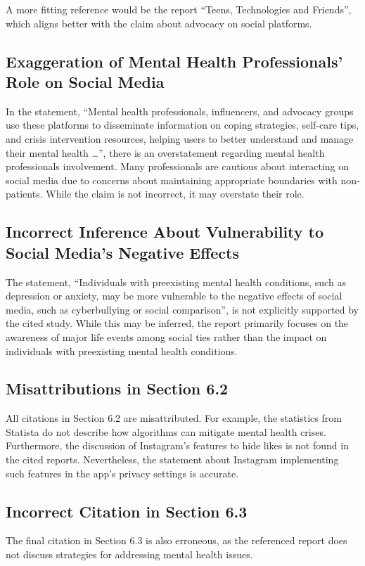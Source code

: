 \documentclass[12pt]{article}
\begin{document}
A more fitting reference would be the report ``Teens, Technologies and Friends'', which aligns better with the claim about advocacy on social platforms.

\subsection{Exaggeration of Mental Health Professionals' Role on Social Media}
In the statement, ``Mental health professionals, influencers, and advocacy groups use these platforms to disseminate information on coping strategies, self-care tips, and crisis intervention resources, helping users to better understand and manage their mental health \dots'', there is an overstatement regarding mental health professionals involvement. Many professionals are cautious about interacting on social media due to concerns about maintaining appropriate boundaries with non-patients. While the claim is not incorrect, it may overstate their role.

\subsection{Incorrect Inference About Vulnerability to Social Media's Negative Effects}
The statement, ``Individuals with preexisting mental health conditions, such as depression or anxiety, may be more vulnerable to the negative effects of social media, such as cyberbullying or social comparison'', is not explicitly supported by the cited study. While this may be inferred, the report primarily focuses on the awareness of major life events among social ties rather than the impact on individuals with preexisting mental health conditions.

\subsection{Misattributions in Section 6.2}
All citations in Section 6.2 are misattributed. For example, the statistics from Statista do not describe how algorithms can mitigate mental health crises. Furthermore, the discussion of Instagram's features to hide likes is not found in the cited reports. Nevertheless, the statement about Instagram implementing such features in the app's privacy settings is accurate.

\subsection{Incorrect Citation in Section 6.3}
The final citation in Section 6.3 is also erroneous, as the referenced report does not discuss strategies for addressing mental health issues.
\end{document}
